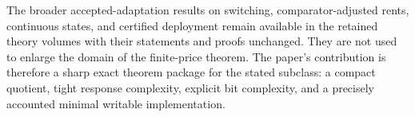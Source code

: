 The broader accepted-adaptation results on switching, comparator-adjusted rents, continuous states, and certified deployment remain available in the retained theory volumes with their statements and proofs unchanged. They are not used to enlarge the domain of the finite-price theorem. The paper's contribution is therefore a sharp exact theorem package for the stated subclass: a compact quotient, tight response complexity, explicit bit complexity, and a precisely accounted minimal writable implementation.